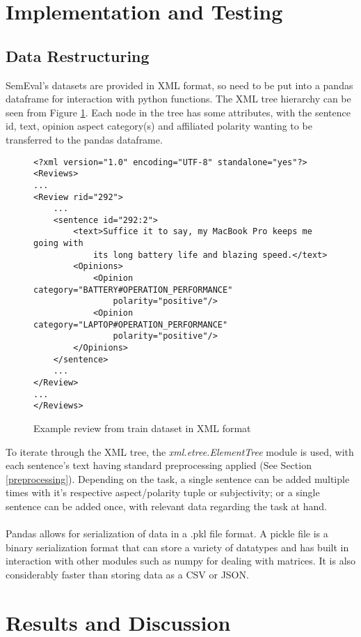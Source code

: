 \documentclass[11pt]{article}
\begin{document}
\section{Implementation and Testing}

\subsection{Data Restructuring}
SemEval's datasets are provided in XML format, so need to be put into a pandas dataframe for interaction with python functions. The XML tree hierarchy can be seen from Figure \ref{fig:xml}. Each node in the tree has some attributes, with the sentence id, text, opinion aspect category(s) and affiliated polarity wanting to be transferred to the pandas dataframe.   

\begin{figure}[h!]
\begin{lstlisting}
<?xml version="1.0" encoding="UTF-8" standalone="yes"?>
<Reviews>
...
<Review rid="292">
    ...
    <sentence id="292:2">
        <text>Suffice it to say, my MacBook Pro keeps me going with 
            its long battery life and blazing speed.</text>
        <Opinions>
            <Opinion category="BATTERY#OPERATION_PERFORMANCE" 
                polarity="positive"/>
            <Opinion category="LAPTOP#OPERATION_PERFORMANCE" 
                polarity="positive"/>
        </Opinions>
    </sentence>
    ...
</Review>
...
</Reviews>
\end{lstlisting}
\label{fig:xml}
\caption{Example review from train dataset in XML format}
\end{figure}

To iterate through the XML tree, the \textit{xml.etree.ElementTree} module is used, with each sentence's text having standard preprocessing applied  (See Section \ref{preprocessing}). Depending on the task, a single sentence can be added multiple times with it's respective aspect/polarity tuple or subjectivity; or a single sentence can be added once, with relevant data regarding the task at hand. \\\\
Pandas allows for serialization of data in a .pkl file format. A pickle file is a binary serialization format that can store a variety of datatypes and has built in interaction with other modules such as numpy for dealing with matrices. It is also considerably faster than storing data as a CSV or JSON. 

\section{Results and Discussion}



\end{document}
